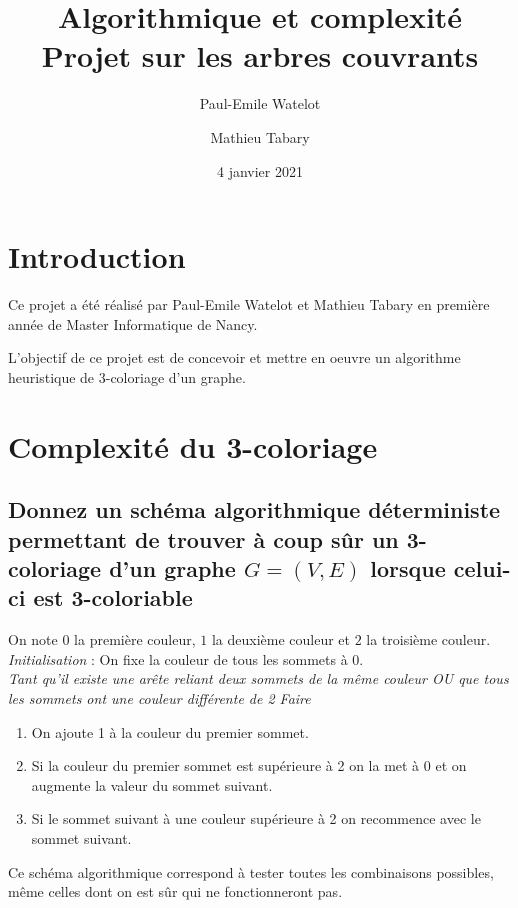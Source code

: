 \documentclass[a4paper, 11pt]{article}
\title{Algorithmique et complexité Projet sur les arbres couvrants}
\author{Paul-Emile Watelot \and Mathieu Tabary}
\date{4 janvier 2021}
\begin{document}
    \maketitle
    \newpage
    \tableofcontents
    \newpage

    \section{Introduction}\label{sec:introduction}

    Ce projet a été réalisé par Paul-Emile Watelot et Mathieu Tabary en première année de Master Informatique de Nancy.

    L'objectif de ce projet est de concevoir et mettre en oeuvre un algorithme heuristique de 3-coloriage d'un graphe.

    \section{Complexité du 3-coloriage}\label{sec:complexite-du-3-coloriage}

    \subsection{Donnez un schéma algorithmique déterministe permettant de trouver à coup sûr un 3-coloriage d'un graphe
    $G=(V, E)$ lorsque celui-ci est 3-coloriable}\label{subsec:Q2A}

    On note $0$ la première couleur, $1$ la deuxième couleur et $2$ la troisième couleur.\\
    \emph{Initialisation} : On fixe la couleur de tous les sommets à 0.\\
    \emph{Tant qu'il existe une arête reliant deux sommets de la même couleur OU que tous les sommets ont une couleur différente de 2 Faire}
    \begin{enumerate}
        \item On ajoute 1 à la couleur du premier sommet.
        \item Si la couleur du premier sommet est supérieure à 2 on la met à 0 et on augmente la valeur du sommet suivant.
        \item Si le sommet suivant à une couleur supérieure à 2 on recommence avec le sommet suivant.
    \end{enumerate}

    Ce schéma algorithmique correspond à tester toutes les combinaisons possibles, même celles dont on est sûr qui ne fonctionneront pas.
\end{document}
